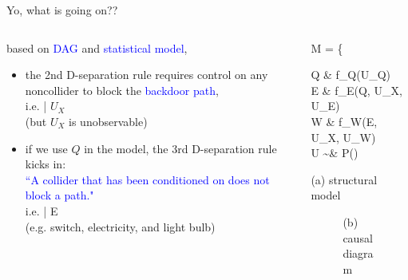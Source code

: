 %
%
\begin{frame}
	{Yo, what is going on??}
	\begin{columns}
		\begin{column}{0.5\textwidth}
			based on \textcolor{blue}{DAG} and \textcolor{blue}{statistical model},
			\begin{itemize}
				\item the 2nd D-separation rule requires control on any noncollider to block the \textcolor{blue}{backdoor path}, \\
				i.e.  \; | $U_{X}$ \\
				{\small (but $U_{X}$  is unobservable)}
				\item if we use $Q$ in the model, the 3rd D-separation rule kicks in: \\
				\textcolor{blue}{``A collider that has been conditioned on does not block a path."}\\
				i.e.  \; | E \\
				{(e.g. switch, electricity, and light bulb)}
			\end{itemize}
		\end{column}
		\begin{column}{0.5\textwidth}  
			\begin{equ}
				M = \left\{ \begin{aligned} 
					Q \leftarrow & \; f_{Q}(U_{Q}) \\
					E \leftarrow & \; f_{E}(Q, U_{X}, U_{E}) \\
					W \leftarrow & \; f_{W}(E, U_{X}, U_{W}) \\
					U \sim & \; P()
				\end{aligned} \right
				\caption*{(a) structural model}
			\end{equ}
			\begin{figure}
				\caption*{(b) causal diagram}
			\end{figure}
		\end{column}
	\end{columns}
\end{frame}
